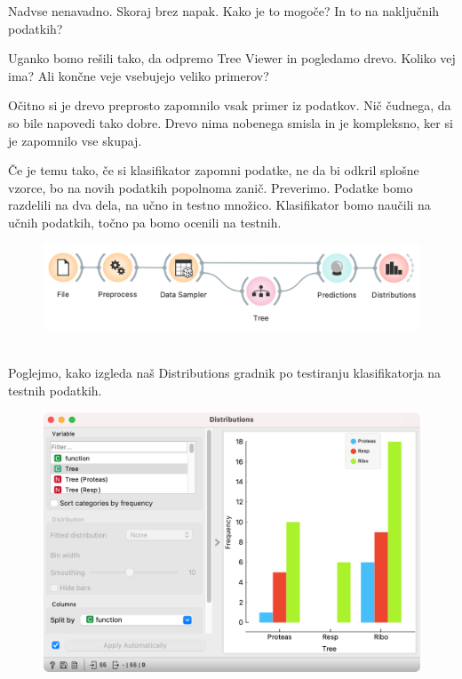 Nadvse nenavadno. Skoraj brez napak. Kako je to mogoče? In to na naključnih podatkih?

Uganko bomo rešili tako, da odpremo Tree Viewer in pogledamo drevo. Koliko vej ima? Ali končne veje vsebujejo veliko primerov?

Očitno si je drevo preprosto zapomnilo vsak primer iz podatkov. Nič čudnega, da so bile napovedi tako dobre. Drevo nima nobenega smisla in je kompleksno, ker si je zapomnilo vse skupaj.

Če je temu tako, če si klasifikator zapomni podatke, ne da bi odkril splošne vzorce, bo na novih podatkih popolnoma zanič. Preverimo. Podatke bomo razdelili na dva dela, na učno in testno množico. Klasifikator bomo naučili na učnih podatkih, točno pa bomo ocenili na testnih.

\begin{figure}[h]
    \includegraphics[width=0.9\linewidth]{workflow3.png}
    \caption{$\;$}
\end{figure}

\newpage
\clearpage

Poglejmo, kako izgleda naš Distributions gradnik po testiranju klasifikatorja na testnih podatkih.

\begin{figure}[h]
    \includegraphics[width=\linewidth]{distributions2.png}
    \caption{$\;$}
\end{figure}

